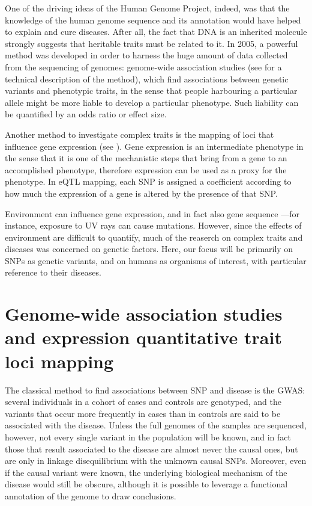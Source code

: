 \documentclass[../main.tex]{subfiles}
\begin{document}
One of the driving ideas of the Human Genome 
Project\autocite{Lander2001,Venter2001}, indeed, was that the knowledge 
of the human genome sequence and its annotation would have helped to 
explain and cure diseases. After all, the fact that DNA is an inherited 
molecule strongly suggests that heritable traits must be related to it. 
In 2005, a powerful method was developed in order to harness the huge 
amount of data collected from the sequencing of genomes: genome-wide 
association studies (see  for a technical description of 
the method), which find associations between genetic variants and 
phenotypic traits, in the sense that people harbouring a particular 
allele might be more liable to develop a particular phenotype. Such 
liability can be quantified by an odds ratio or effect size.

Another method to investigate complex traits is the mapping of loci that 
influence gene expression (see ). Gene expression is an 
intermediate phenotype in the sense that it is one of the mechanistic 
steps that bring from a gene to an accomplished phenotype, therefore 
expression can be used as a proxy for the phenotype. In eQTL mapping, 
each SNP is assigned a coefficient according to how much the expression 
of a gene is altered by the presence of that SNP.

Environment can influence gene expression, and in fact also gene 
sequence ---for instance, exposure to UV rays can cause mutations. 
However, since the effects of environment are difficult to quantify, 
much of the reaserch on complex traits and diseases was concerned on 
genetic factors. Here, our focus will be primarily on SNPs as genetic 
variants, and on humans as organisms of interest, with particular 
reference to their diseases.

\section{Genome-wide association studies and expression quantitative 
	trait loci mapping}


The classical method to find associations between SNP and disease is the 
GWAS: several individuals in a cohort of cases and controls are 
genotyped, and the variants that occur more frequently in cases than in 
controls are said to be associated with the disease. Unless the full 
genomes of the samples are sequenced, however, not every single variant 
in the population will be known, and in fact those that result 
associated to the disease are almost never the causal ones, but are only 
in linkage disequilibrium with the unknown causal 
SNPs\autocite{Visscher2012}. Moreover, even if the causal variant were 
known, the underlying biological mechanism of the disease would still be 
obscure, although it is possible to leverage a functional annotation of 
the genome to draw conclusions.
\end{document}
